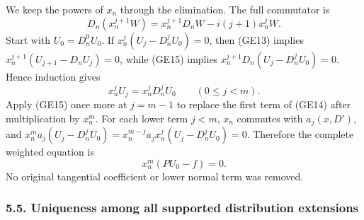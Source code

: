 \documentclass[
  11pt,
]{article}
\begin{document}
We keep the powers of \(x_n\) through the elimination. The full
commutator is \[
 D_n(x_n^{j+1}W)
   =x_n^{j+1}D_nW-i(j+1)x_n^jW.
 \tag{GE15}
\] Start with \(U_0=D_n^0U_0\). If \(x_n^j(U_j-D_n^jU_0)=0\), then
(GE13) implies \(x_n^{j+1}(U_{j+1}-D_nU_j)=0\), while (GE15) implies
\(x_n^{j+1}D_n(U_j-D_n^jU_0)=0\). Hence induction gives \[
 x_n^jU_j=x_n^jD_n^jU_0\qquad(0\le j<m).
 \tag{GE16}
\] Apply (GE15) once more at \(j=m-1\) to replace the first term of
(GE14) after multiplication by \(x_n^m\). For each lower term \(j<m\),
\(x_n\) commutes with \(a_j(x,D')\), and \(x_n^m a_j(U_j-D_n^jU_0)
=x_n^{m-j}a_jx_n^j(U_j-D_n^jU_0)=0\). Therefore the complete weighted
equation is \[
 x_n^m(PU_0-f)=0.
 \tag{GE17}
\] No original tangential coefficient or lower normal term was removed.

\subsubsection{5.5. Uniqueness among all supported distribution
extensions}\label{uniqueness-among-all-supported-distribution-extensions}
\end{document}

